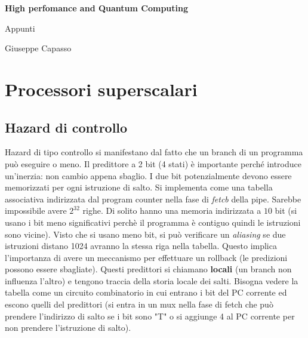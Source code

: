 \documentclass{article}
\begin{document}
\begin{titlepage}
    \begin{center}
        \vspace*{1cm}
            
        \Huge
        \textbf{High perfomance and Quantum Computing}
            
        \vspace{0.5cm}
        \LARGE
        Appunti
        
        \vfill
        \vspace{0.8cm}
        
        \Large
        Giuseppe Capasso

    \end{center}
\end{titlepage}

\tableofcontents
\newpage

\section{Processori superscalari}
\subsection{Hazard di controllo}
Hazard di tipo controllo si manifestano dal fatto che un branch di un programma può eseguire o meno. 
Il predittore a 2 bit (4 stati) è importante perché introduce un'inerzia: non cambio appena sbaglio.
I due bit potenzialmente devono essere memorizzati per ogni istruzione di salto. Si implementa come una tabella
 associativa indirizzata dal program counter nella fase di \textit{fetcb} della pipe. Sarebbe impossibile avere $2^{32}$ righe. 
 Di solito hanno una memoria indirizzata a $10$ bit (si usano i bit meno significativi perchè il programma è contiguo quindi le istruzioni sono vicine). Visto che si usano meno bit, si può verificare un \textit{aliasing} se due istruzioni distano 1024 avranno la stessa riga nella tabella. Questo implica l'importanza di avere un meccanismo per effettuare un rollback (le predizioni possono essere sbagliate). Questi predittori si chiamano \textbf{locali} (un branch non influenza l'altro) e tengono traccia della storia locale dei salti. Bisogna vedere la tabella come un circuito combinatorio in cui entrano i bit del PC corrente ed escono quelli del predittori (si entra in un mux nella fase di fetch che può prendere l'indirizzo di salto se i bit sono "T" o si aggiunge 4 al PC corrente per non prendere l'istruzione di salto).
\end{document}
